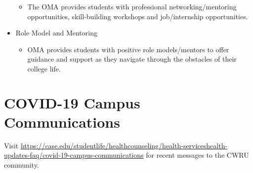 \documentclass[
]{book}
\providecommand{\tightlist}{%
  \setlength{\itemsep}{0pt}\setlength{\parskip}{0pt}}
\begin{document}
\begin{itemize}
  \begin{itemize}
  \tightlist
  \item
    The OMA provides students with professional networking/mentoring opportunities, skill-building workshops and job/internship opportunities.
  \end{itemize}
\item
  Role Model and Mentoring

  \begin{itemize}
  \tightlist
  \item
    OMA provides students with positive role models/mentors to offer guidance and support as they navigate through the obstacles of their college life.
  \end{itemize}
\end{itemize}

\hypertarget{covid-19-campus-communications}{%
\section{COVID-19 Campus Communications}\label{covid-19-campus-communications}}

Visit \url{https://case.edu/studentlife/healthcounseling/health-serviceshealth-updates-faq/covid-19-campus-communications} for recent messages to the CWRU community.
\end{document}
